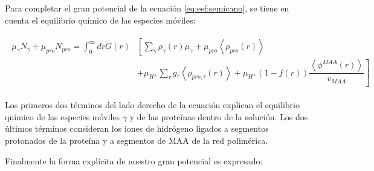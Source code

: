 Para completar el gran potencial de la  ecuaci\'on  \ref{eq:esf:semicano}, se tiene en cuenta el equilibrio qu\'imico de las especies m\'oviles:
 

\begin{align}
	\begin{aligned}
		\mu_\gamma N_\gamma + \mu_{pro} N_{pro} =\int_0^\infty drG(r)&\left[\sum_{\gamma }{\rho_\gamma(r)\mu_\gamma}
		+ \mu_{pro} \left<\rho_{pro}(r)\right> \right. \\
		& \left. +\mu_{H^+}\sum_{\tau}{g_\tau\left<\rho_{pro,\tau}(r)\right> } +\mu_{H^+}(1-f(r))\dfrac{\left<\phi^{MAA}(r)\right>}{v_{MAA}}\right]
	\end{aligned}
\end{align}


Los primeros dos t\'erminos del lado derecho de la ecuaci\'on explican el equilibrio qu\'imico de las especies m\'oviles $\gamma$ y de las prote\'inas dentro de la soluci\'on.
Los dos \'ultimos t\'erminos consideran los iones de hidr\'ogeno ligados a segmentos protonados de la prote\'ina y a segmentos de  MAA de la red polim\'erica.

Finalmente la forma expl\'icita de nuestro gran potencial es expresado:

